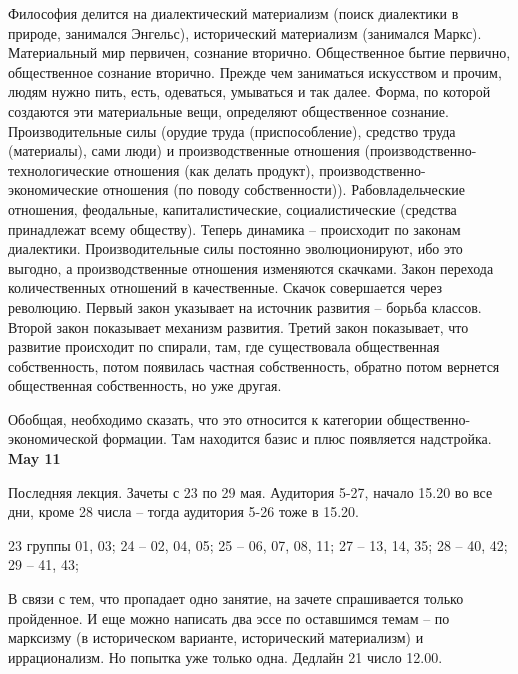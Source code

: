 \documentclass[a4paper, 12pt]{article}
\begin{document}
Философия делится на диалектический материализм (поиск диалектики в природе, занимался Энгельс), исторический материализм (занимался Маркс). Материальный мир первичен, сознание вторично. Общественное бытие первично, общественное сознание вторично. Прежде чем заниматься искусством и прочим, людям нужно пить, есть, одеваться, умываться и так далее. Форма, по которой создаются эти материальные вещи, определяют общественное сознание. Производительные силы (орудие труда (приспособление), средство труда (материалы), сами люди) и производственные отношения (производственно-технологические отношения (как делать продукт), производственно-экономические отношения (по поводу собственности)). Рабовладельческие отношения, феодальные, капиталистические, социалистические (средства принадлежат всему обществу). Теперь динамика -- происходит по законам диалектики. Производительные силы постоянно эволюционируют, ибо это выгодно, а производственные отношения изменяются скачками. Закон перехода количественных отношений в качественные. Скачок совершается через революцию. Первый закон указывает на источник развития -- борьба классов. Второй закон показывает механизм развития. Третий закон показывает, что развитие происходит по спирали, там, где существовала общественная собственность, потом появилась частная собственность, обратно потом вернется общественная собственность, но уже другая. 

Обобщая, необходимо сказать, что это относится к категории общественно-экономической формации. Там находится базис и плюс появляется надстройка. 
\\

\hfill \textbf{May 11}

Последняя лекция. 
Зачеты с 23 по 29 мая. Аудитория 5-27, начало 15.20 во все дни, кроме 28 числа -- тогда аудитория 5-26 тоже в 15.20. 

23 группы 01, 03;
24 -- 02, 04, 05;
25 -- 06, 07, 08, 11;
27 -- 13, 14, 35;
28 -- 40, 42;
29 -- 41, 43;

В связи с тем, что пропадает одно занятие, на зачете спрашивается только пройденное. И еще можно написать два эссе по оставшимся темам -- по марксизму (в историческом варианте, исторический материализм) и иррационализм. Но попытка уже только одна. Дедлайн 21 число 12.00. 
\end{document}
